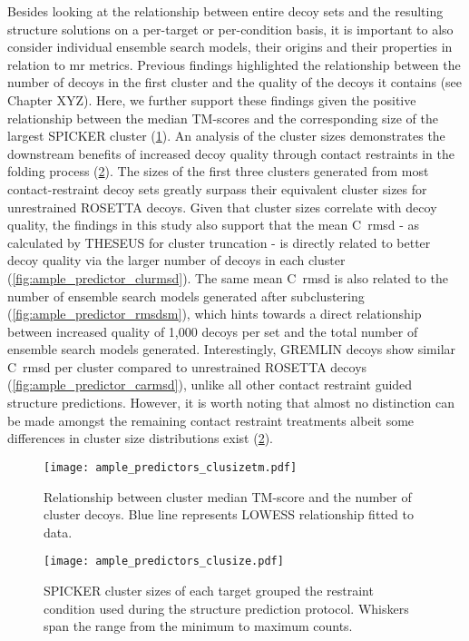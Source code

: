 Besides looking at the relationship between entire decoy sets and the resulting structure solutions on a per-target or per-condition basis, it is important to also consider individual ensemble search models, their origins and their properties in relation to \gls{mr} metrics. Previous findings highlighted the relationship between the number of decoys in the first cluster and the quality of the decoys it contains (see Chapter XYZ). Here, we further support these findings given the positive relationship between the median TM-scores and the corresponding size of the largest SPICKER cluster (\cref{fig:ample_predictor_clusizetm}). An analysis of the cluster sizes demonstrates the downstream benefits of increased decoy quality through contact restraints in the folding process (\cref{fig:ample_predictor_clusize}). The sizes of the first three clusters generated from most contact-restraint decoy sets greatly surpass their equivalent cluster sizes for unrestrained ROSETTA decoys. Given that cluster sizes correlate with decoy quality, the findings in this study also support that the mean C\textalpha\ \gls{rmsd} - as calculated by THESEUS for cluster truncation - is directly related to better decoy quality via the larger number of decoys in each cluster (\cref{fig:ample_predictor_clurmsd}). The same mean C\textalpha\ \gls{rmsd} is also related to the number of ensemble search models generated after subclustering (\cref{fig:ample_predictor_rmsdsm}), which hints towards a direct relationship between increased quality of 1,000 decoys per set and the total number of ensemble search models generated. Interestingly, GREMLIN decoys show similar C\textalpha\ \gls{rmsd} per cluster compared to unrestrained ROSETTA decoys (\cref{fig:ample_predictor_carmsd}), unlike all other contact restraint guided structure predictions. However, it is worth noting that almost no distinction can be made amongst the remaining contact restraint treatments albeit some differences in cluster size distributions exist (\cref{fig:ample_predictor_clusize}).

\begin{figure}[H]
    \centering
    \texttt{[image: ample\_predictors\_clusizetm.pdf]}
    \caption{Relationship between cluster median TM-score and the number of cluster decoys. Blue line represents LOWESS relationship fitted to data.}
    \label{fig:ample_predictor_clusizetm}
\end{figure}

\begin{figure}[H]
    \centering
    \texttt{[image: ample\_predictors\_clusize.pdf]}
    \caption{SPICKER cluster sizes of each target grouped the restraint condition used during the structure prediction protocol. Whiskers span the range from the minimum to maximum counts.}
    \label{fig:ample_predictor_clusize}
\end{figure}

